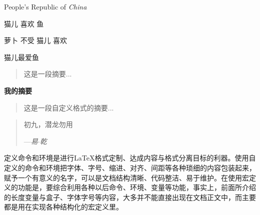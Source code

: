 \documentclass{ctexart}
\newcommand{\PRC}{People's Republic of \emph{China}}
\newcommand{\loves}[2]{#1 喜欢 #2}
\newcommand{\hatedby}[2]{#2 不受 #1 喜欢}
\newcommand{\love}[3][喜欢]{#2#1#3}
\newenvironment{myabstract}[1][摘要]{
    \small
    \begin{center}
        \bfseries #1
    \end{center}
    \begin{quotation}
}{
    \end{quotation}
}
\newenvironment{Quotation}[1]{
    \newcommand{\quotesource}{#1}
    \begin{quotation}
}{
    \par\hfill---\textit{\quotesource}
    \end{quotation}
}
\begin{document}
    \PRC

    \loves{猫儿}{鱼}

    \hatedby{猫儿}{萝卜}
    
    \love[最爱]{猫儿}{鱼}

    \begin{abstract}
        这是一段摘要...
    \end{abstract}

    \begin{myabstract}[我的摘要]
        这是一段自定义格式的摘要...
    \end{myabstract}

    \begin{Quotation}{易$\cdot$乾}
        初九，潜龙勿用
    \end{Quotation}

    定义命令和环境是进行\LaTeX{}格式定制、达成内容与格式分离目标的利器。使用自定义的命令和环境把字体、字号、缩进、对齐、间距等各种琐细的内容包装起来，赋予一个有意义的名字，可以是文档结构清晰、代码整洁、易于维护。在使用宏定义的功能是，要综合利用各种以后命令、环境、变量等功能，事实上，前面所介绍的长度变量与盒子、字体字号等内容，大多并不能直接出现在文档正文中，而主要都是用在实现各种结构化的宏定义里。
    
\end{document}
